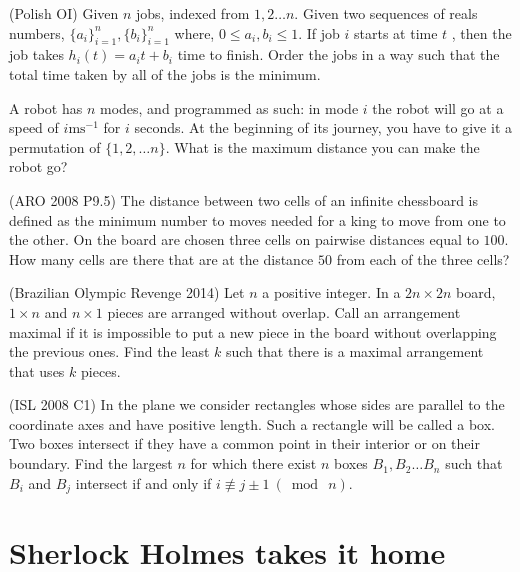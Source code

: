 \documentclass[12pt,a4paper]{article}
\begin{document}
			\begin{problem}(Polish OI)
				Given $ n $ jobs, indexed from $ 1, 2\dots n $. Given two sequences of reals numbers, $ \{a_i\}^n_{i=1}, \{b_i\}^n_{i=1} $ where, $ 0 \leq a_i, b_i \leq 1 $. If job $ i $ starts at time $ t $ , then the job takes $ h_i(t) = a_it+b_i $ time to finish. Order the jobs in a way such that the total time taken by all of the jobs is the minimum.
			\end{problem}
		
			\begin{problem}
				A robot has $ n $ modes, and programmed as such: in mode $ i $ the robot will go at a speed of $ i \text{ms}^{-1} $ for $ i $ seconds. At the beginning of its journey, you have to give it a permutation of $ \{1, 2, \dots n \} $. What is the maximum distance you can make the robot go?
			\end{problem}
		
			\begin{problem}(ARO 2008 P9.5)
				The distance between two cells of an infinite chessboard is defined as the minimum number to moves needed for a king to move from one to the other. On the board are chosen three cells on pairwise distances equal to $ 100 $. How many cells are there that are at the distance $ 50 $ from each of the three cells?
			\end{problem}
		
			\begin{problem}(Brazilian Olympic Revenge 2014)
				Let $ n $ a positive integer. In a $ 2n\times 2n $ board, $ 1\times n $ and $ n\times 1 $ pieces are arranged without overlap. Call an arrangement maximal if it is impossible to put a new piece in the board without overlapping the previous ones. Find the least $ k $ such that there is a maximal arrangement that uses $ k $ pieces.
			\end{problem}
	
			\begin{problem}(ISL 2008 C1)
				In the plane we consider rectangles whose sides are parallel to the coordinate axes and have positive length. Such a rectangle will be called a box. Two boxes intersect if they have a common point in their interior or on their boundary. Find the largest $ n $ for which there exist $ n $ boxes $ B_1, B_2\dots B_n $ such that $ B_i $ and $ B_j $ intersect if and only if $ i \not\equiv j\pm 1\ (\bmod\ n) $.
			\end{problem}
	
	\section{Sherlock Holmes takes it home}	
	
\end{document}
